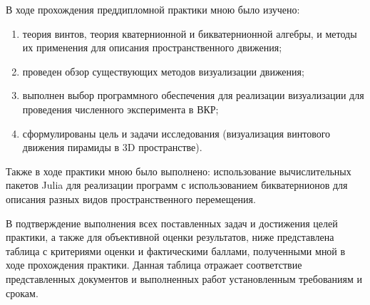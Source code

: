 В ходе прохождения преддипломной практики мною было изучено:
\begin{enumerate}
    \item теория винтов, теория кватернионной и бикватернионной алгебры, и методы их применения для описания пространственного движения;
    \item проведен обзор существующих методов визуализации движения;
    \item выполнен выбор программного обеспечения для реализации визуализации для проведения численного эксперимента в ВКР;
    \item сформулированы цель и задачи исследования (визуализация винтового движения пирамиды в 3D пространстве).
\end{enumerate}

Также в ходе практики мною было выполнено: использование вычислительных пакетов Julia для реализации программ с использованием бикватернионов для описания разных видов пространственного перемещения.

В подтверждение выполнения всех поставленных задач и достижения целей практики, а также для объективной оценки результатов, ниже представлена таблица с критериями оценки и фактическими баллами, полученными мной в ходе прохождения практики. Данная таблица отражает соответствие представленных документов и выполненных работ установленным требованиям и срокам.


